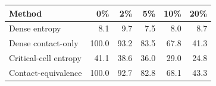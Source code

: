 \begin{tabular}{lrrrrr}
\toprule
Method & 0\% & 2\% & 5\% & 10\% & 20\% \\
\midrule
Dense entropy & 8.1 & 9.7 & 7.5 & 8.0 & 8.7 \\
Dense contact-only & 100.0 & 93.2 & 83.5 & 67.8 & 41.3 \\
Critical-cell entropy & 41.1 & 38.6 & 36.0 & 29.0 & 24.8 \\
Contact-equivalence & 100.0 & 92.7 & 82.8 & 68.1 & 43.3 \\
\bottomrule
\end{tabular}
